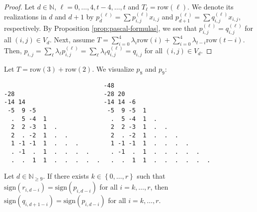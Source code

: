 \begin{proof}
    Let \( d \in \mathbb{N} \), \( \ell = 0, \dots, 4,t-4,\dots,t \) and \(T_{\ell} =  \mathrm{row}(\ell) \). We denote its realizations in \( d \) and \( d + 1 \) by \( p_d^{(\ell)} = \sum p_{i,j}^{(\ell)}x_{i,j} \) and \( p_{d+1}^{(\ell)} = \sum q_{i,j}^{(\ell)}x_{i,j} \), respectively. By Proposition \ref{prop:pascal-formulas}, we see that \( p_{i,j}^{(\ell)} = q_{i,j}^{(\ell)} \) for all \( (i,j) \in V_d \). Next, assume \( T =  \sum_{i=0}^{4}  \lambda_{i} \mathrm{row}(i) + \sum_{i=0}^{4}  \lambda_{t-i} \mathrm{row}(t-i)  \). Then, \( p_{i,j} = \sum_{\ell} \lambda_\ell p_{i,j}^{(\ell)} = \sum_{\ell} \lambda_\ell q_{i,j}^{(\ell)} = q_{i,j} \) for all \( (i,j) \in V_d \).
\end{proof}
  
\pagebreak
\begin{example}
    Let \( T = \mathrm{row}(3) + \mathrm{row}(2) \). We visualize \( p_8 \) and \( p_9 \):
    \begin{verbatim}
                            -48
-28                         -28 20
-14 14                      -14 14 -6
 -5  9 -5                    -5  9 -5  1
  .  5 -4  1                  .  5 -4  1  . 
  2  2 -3  1  .               2  2 -3  1  .  .
  2  . -2  1  .  .            2  . -2  1  .  .  .
  1 -1 -1  1  .  .  .         1 -1 -1  1  .  .  .  .
  . -1  .  1  .  .  .  .      . -1  .  1  .  .  .  .  .
  .  .  1  1  .  .  .  .  .   .  .  1  1  .  .  .  .  .  .
    \end{verbatim}
  \end{example}
  
\begin{lemma}\label{lemma:sign_row_propagation}
    Let \( d \in \mathbb{N}_{\geq 9} \). If there exists \( k \in \left\{ 0, \dots, r \right\} \) such that $\mathrm{sign}(r_{i,d-i}) = \mathrm{sign}(p_{i,d-i})$ for all \( i = k, \dots, r \), then \( \mathrm{sign}(q_{i,d+1-i}) = \mathrm{sign}(p_{i,d-i}) \) for all \( i = k, \dots, r\).
\end{lemma}

